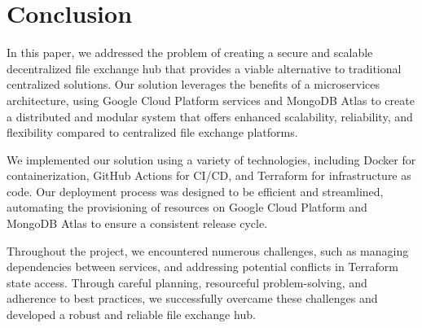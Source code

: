 \documentclass[a4paper,fleqn]{cas-dc}
\begin{document}
\section{Conclusion}

In this paper, we addressed the problem of creating a secure and scalable decentralized file exchange hub that provides a viable alternative to traditional centralized solutions. Our solution leverages the benefits of a microservices architecture, using Google Cloud Platform services and MongoDB Atlas to create a distributed and modular system that offers enhanced scalability, reliability, and flexibility compared to centralized file exchange platforms.

We implemented our solution using a variety of technologies, including Docker for containerization, GitHub Actions for CI/CD, and Terraform for infrastructure as code. Our deployment process was designed to be efficient and streamlined, automating the provisioning of resources on Google Cloud Platform and MongoDB Atlas to ensure a consistent release cycle.

Throughout the project, we encountered numerous challenges, such as managing dependencies between services, and addressing potential conflicts in Terraform state access. Through careful planning, resourceful problem-solving, and adherence to best practices, we successfully overcame these challenges and developed a robust and reliable file exchange hub.

%
%



\end{document}
